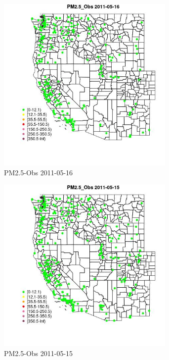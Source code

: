 \begin{figure} 
\centering  
\includegraphics[width=0.77\textwidth]{Code_Outputs/ML_input_report_ML_input_PM25_Step5_part_d_de_duplicated_aves_ML_input_MapObsPM25_Obs2011-05-16.jpg} 
\caption{\label{fig:ML_input_report_ML_input_PM25_Step5_part_d_de_duplicated_aves_ML_inputMapObsPM25_Obs2011-05-16}PM2.5-Obs 2011-05-16} 
\end{figure} 
 

\begin{figure} 
\centering  
\includegraphics[width=0.77\textwidth]{Code_Outputs/ML_input_report_ML_input_PM25_Step5_part_d_de_duplicated_aves_ML_input_MapObsPM25_Obs2011-05-15.jpg} 
\caption{\label{fig:ML_input_report_ML_input_PM25_Step5_part_d_de_duplicated_aves_ML_inputMapObsPM25_Obs2011-05-15}PM2.5-Obs 2011-05-15} 
\end{figure} 
 

